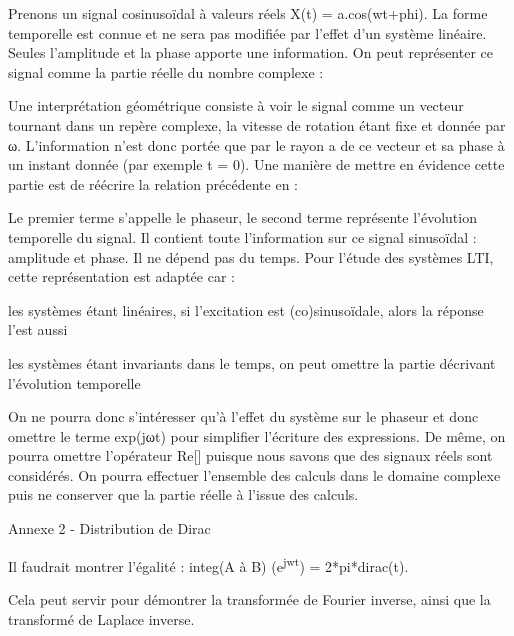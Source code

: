\documentclass[]{article}
\begin{document}
Prenons un signal cosinusoïdal à valeurs réels X(t) = a.cos(wt+phi). La
forme temporelle est connue et ne sera pas modifiée par l'effet d'un
système linéaire. Seules l'amplitude et la phase apporte une
information. On peut représenter ce signal comme la partie réelle du
nombre complexe :

Une interprétation géométrique consiste à voir le signal comme un
vecteur tournant dans un repère complexe, la vitesse de rotation étant
fixe et donnée par ω. L'information n'est donc portée que par le rayon a
de ce vecteur et sa phase à un instant donnée (par exemple t = 0). Une
manière de mettre en évidence cette partie est de réécrire la relation
précédente en :

Le premier terme s'appelle le phaseur, le second terme représente
l'évolution temporelle du signal. Il contient toute l'information sur ce
signal sinusoïdal : amplitude et phase. Il ne dépend pas du temps. Pour
l'étude des systèmes LTI, cette représentation est adaptée car :

les systèmes étant linéaires, si l'excitation est (co)sinusoïdale, alors
la réponse l'est aussi

les systèmes étant invariants dans le temps, on peut omettre la partie
décrivant l'évolution temporelle

On ne pourra donc s'intéresser qu'à l'effet du système sur le phaseur et
donc omettre le terme exp(jωt) pour simplifier l'écriture des
expressions. De même, on pourra omettre l'opérateur Re{[}{]} puisque
nous savons que des signaux réels sont considérés. On pourra effectuer
l'ensemble des calculs dans le domaine complexe puis ne conserver que la
partie réelle à l'issue des calculs.

Annexe 2 - Distribution de Dirac

Il faudrait montrer l'égalité : integ(A à B) (e\textsuperscript{jwt}) =
2*pi*dirac(t).

Cela peut servir pour démontrer la transformée de Fourier inverse, ainsi
que la transformé de Laplace inverse.
\end{document}
